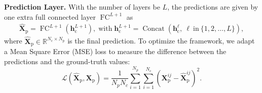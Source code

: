 \textbf{Prediction Layer.}
With the number of layers be $L$, the predictions are given by one extra full connected layer $\operatorname{FC}^{L +1}$ as
\begin{equation}
    \begin{split}
      \widehat{\mathbf{X}}_{\text{p}} = \operatorname{FC}^{L + 1}\left(\mathbf{h}_{\text{c}}^{L+1} \right), \; \text{with} \;  \mathbf{h}_{\text{c}}^{L+1} = \operatorname{Concat}\left(\mathbf{h}_{\text{c}}^{\ell},\ \ell\ \text{in}\ \{1, 2, \dots, L\} \right),
    \end{split}
\end{equation}
where $\widehat{\mathbf{X}}_{\text{p}}\in \mathbb{R}^{N_{\text{c}}\times N_{\text{p}}}$ is the final prediction. To optimize the framework, we adapt a Mean Square Error (MSE) loss to measure the difference between the predictions and the ground-truth values:
\begin{equation}
    \mathcal{L} \left(\widehat{\mathbf{X}}_{\text{p}}, \mathbf{X}_{\text{p}}\right) = \frac{1}{N_p N_c} \sum_{i=1}^{N_p}\sum_{i=1}^{N_c}\left(\mathbf{X}_{\text{p}}^{ij}-\widehat{\mathbf{X}}_{\text{p}}^{ij}\right)^{2} .
\end{equation}